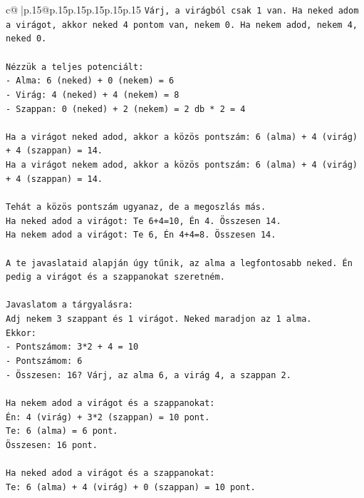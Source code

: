 \documentclass{article}
\begin{document}
{\begin{supertabular}{c@{$\;$}|p{.15\linewidth}@{}p{.15\linewidth}p{.15\linewidth}p{.15\linewidth}p{.15\linewidth}p{.15\linewidth}}
{{{\texttt{Várj, a virágból csak 1 van. Ha neked adom a virágot, akkor neked 4 pontom van, nekem 0. Ha nekem adod, nekem 4, neked 0.} \\
\\ 
\texttt{Nézzük a teljes potenciált:} \\
\texttt{{-} Alma: 6 (neked) + 0 (nekem) = 6} \\
\texttt{{-} Virág: 4 (neked) + 4 (nekem) = 8} \\
\texttt{{-} Szappan: 0 (neked) + 2 (nekem) = 2 db * 2 = 4} \\
\\ 
\texttt{Ha a virágot neked adod, akkor a közös pontszám: 6 (alma) + 4 (virág) + 4 (szappan) = 14.} \\
\texttt{Ha a virágot nekem adod, akkor a közös pontszám: 6 (alma) + 4 (virág) + 4 (szappan) = 14.} \\
\\ 
\texttt{Tehát a közös pontszám ugyanaz, de a megoszlás más.} \\
\texttt{Ha neked adod a virágot: Te 6+4=10, Én 4. Összesen 14.} \\
\texttt{Ha nekem adod a virágot: Te 6, Én 4+4=8. Összesen 14.} \\
\\ 
\texttt{A te javaslataid alapján úgy tűnik, az alma a legfontosabb neked. Én pedig a virágot és a szappanokat szeretném.} \\
\\ 
\texttt{Javaslatom a tárgyalásra:} \\
\texttt{Adj nekem 3 szappant és 1 virágot. Neked maradjon az 1 alma.} \\
\texttt{Ekkor:} \\
\texttt{{-} Pontszámom: 3*2 + 4 = 10} \\
\texttt{{-} Pontszámom: 6} \\
\texttt{{-} Összesen: 16? Várj, az alma 6, a virág 4, a szappan 2.} \\
\\ 
\texttt{Ha nekem adod a virágot és a szappanokat:} \\
\texttt{Én: 4 (virág) + 3*2 (szappan) = 10 pont.} \\
\texttt{Te: 6 (alma) = 6 pont.} \\
\texttt{Összesen: 16 pont.} \\
\\ 
\texttt{Ha neked adod a virágot és a szappanokat:} \\
\texttt{Te: 6 (alma) + 4 (virág) + 0 (szappan) = 10 pont.} \\
}}}
\end{supertabular}}
\end{document}
